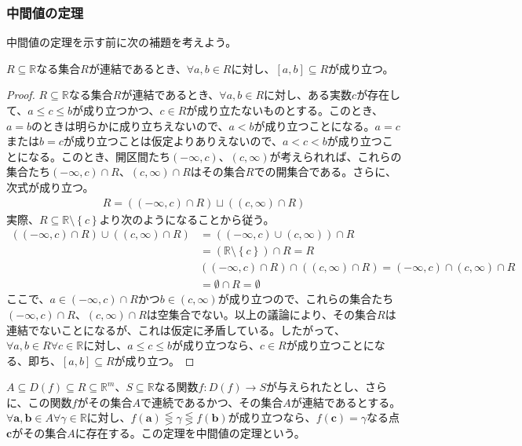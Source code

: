 \documentclass[dvipdfmx]{jsarticle}
\begin{document}
\subsubsection{中間値の定理}%
中間値の定理を示す前に次の補題を考えよう。
\begin{thm}\label{4.1.12.6}
$R \subseteq \mathbb{R}$なる集合$R$が連結であるとき、$\forall a,b \in R$に対し、$[ a,b] \subseteq R$が成り立つ。
\end{thm}
\begin{proof}
$R \subseteq \mathbb{R}$なる集合$R$が連結であるとき、$\forall a,b \in R$に対し、ある実数$c$が存在して、$a \leq c \leq b$が成り立つかつ、$c \in R$が成り立たないものとする。このとき、$a = b$のときは明らかに成り立ちえないので、$a < b$が成り立つことになる。$a = c$または$b = c$が成り立つことは仮定よりありえないので、$a < c < b$が成り立つことになる。このとき、開区間たち$( - \infty,c)$、$(c,\infty)$が考えられれば、これらの集合たち$( - \infty,c) \cap R$、$(c,\infty) \cap R$はその集合$R$での開集合である。さらに、次式が成り立つ。
\begin{align*}
R = \left( ( - \infty,c) \cap R \right) \sqcup \left( (c,\infty) \cap R \right)
\end{align*}
実際、$R \subseteq \mathbb{R} \setminus \left\{ c \right\}$より次のようになることから従う。
\begin{align*}
\left( ( - \infty,c) \cap R \right) \cup \left( (c,\infty) \cap R \right) &= \left( ( - \infty,c) \cup (c,\infty) \right) \cap R\\
&= \left( \mathbb{R} \setminus \left\{ c \right\} \right) \cap R = R\\
&\left( ( - \infty,c) \cap R \right) \cap \left( (c,\infty) \cap R \right) = ( - \infty,c) \cap (c,\infty) \cap R\\
&= \emptyset \cap R = \emptyset
\end{align*}
ここで、$a \in ( - \infty,c) \cap R$かつ$b \in (c,\infty)$が成り立つので、これらの集合たち$( - \infty,c) \cap R$、$(c,\infty) \cap R$は空集合でない。以上の議論により、その集合$R$は連結でないことになるが、これは仮定に矛盾している。したがって、$\forall a,b \in R\forall c \in \mathbb{R}$に対し、$a \leq c \leq b$が成り立つなら、$c \in R$が成り立つことになる、即ち、$[ a,b] \subseteq R$が成り立つ。
\end{proof}
\begin{thm}[中間値の定理]\label{4.1.12.7}
$A \subseteq D(f) \subseteq R \subseteq \mathbb{R}^{m}$、$S \subseteq \mathbb{R}$なる関数$f:D(f) \rightarrow S$が与えられたとし、さらに、この関数$f$がその集合$A$で連続であるかつ、その集合$A$が連結であるとする。$\forall\mathbf{a},\mathbf{b} \in A\forall\gamma \in \mathbb{R}$に対し、$f\left( \mathbf{a} \right) \lesseqgtr \gamma \lesseqgtr f\left( \mathbf{b} \right)$が成り立つなら、$f\left( \mathbf{c} \right) = \gamma$なる点$\mathbf{c}$がその集合$A$に存在する。この定理を中間値の定理という。
\end{thm}
\end{document}
